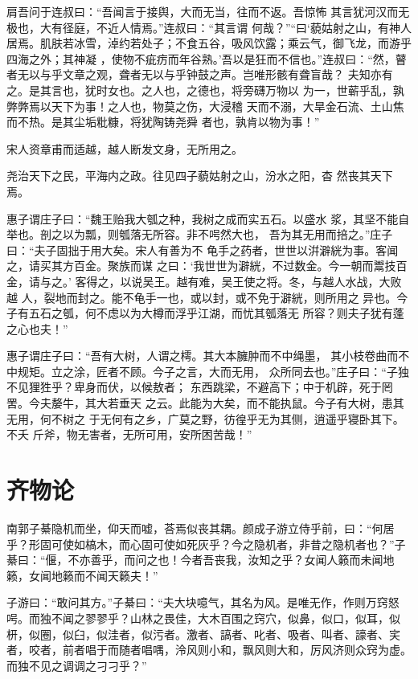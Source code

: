 \documentclass[a4paper,12pt,UTF8,twoside]{ctexbook}
\begin{document}
肩吾问于连叔曰：“吾闻言于接舆，大而无当，往而不返。吾惊怖 其言犹河汉而无极也，大有径庭，不近人情焉。”连叔曰：“其言谓 何哉？”“曰‘藐姑射之山，有神人居焉。肌肤若冰雪，淖约若处子；不食五谷，吸风饮露；乘云气，御飞龙，而游乎四海之外；其神凝 ，使物不疵疠而年谷熟。’吾以是狂而不信也。”连叔曰：“然，瞽 者无以与乎文章之观，聋者无以与乎钟鼓之声。岂唯形骸有聋盲哉？ 夫知亦有之。是其言也，犹时女也。之人也，之德也，将旁礴万物以 为一，世蕲乎乱，孰弊弊焉以天下为事！之人也，物莫之伤，大浸稽 天而不溺，大旱金石流、土山焦而不热。是其尘垢粃糠，将犹陶铸尧舜 者也，孰肯以物为事！”

宋人资章甫而适越，越人断发文身，无所用之。

尧治天下之民，平海内之政。往见四子藐姑射之山，汾水之阳，杳 然丧其天下焉。

惠子谓庄子曰：“魏王贻我大瓠之种，我树之成而实五石。以盛水 浆，其坚不能自举也。剖之以为瓢，则瓠落无所容。非不呺然大也， 吾为其无用而掊之。”庄子曰：“夫子固拙于用大矣。宋人有善为不 龟手之药者，世世以洴澼絖为事。客闻之，请买其方百金。聚族而谋 之曰：‘我世世为澼絖，不过数金。今一朝而鬻技百金，请与之。’ 客得之，以说吴王。越有难，吴王使之将。冬，与越人水战，大败越 人，裂地而封之。能不龟手一也，或以封，或不免于澼絖，则所用之 异也。今子有五石之瓠，何不虑以为大樽而浮乎江湖，而忧其瓠落无 所容？则夫子犹有蓬之心也夫！”

惠子谓庄子曰：“吾有大树，人谓之樗。其大本臃肿而不中绳墨， 其小枝卷曲而不中规矩。立之涂，匠者不顾。今子之言，大而无用， 众所同去也。”庄子曰：“子独不见狸狌乎？卑身而伏，以候敖者； 东西跳梁，不避高下；中于机辟，死于罔罟。今夫嫠牛，其大若垂天 之云。此能为大矣，而不能执鼠。今子有大树，患其无用，何不树之 于无何有之乡，广莫之野，彷徨乎无为其侧，逍遥乎寝卧其下。不夭 斤斧，物无害者，无所可用，安所困苦哉！”

\section{齐物论}

南郭子綦隐机而坐，仰天而嘘，荅焉似丧其耦。颜成子游立侍乎前，曰：“何居乎？形固可使如槁木，而心固可使如死灰乎？今之隐机者，非昔之隐机者也？”子綦曰：“偃，不亦善乎，而问之也！今者吾丧我，汝知之乎？女闻人籁而未闻地籁，女闻地籁而不闻天籁夫！”

子游曰：“敢问其方。”子綦曰：“夫大块噫气，其名为风。是唯无作，作则万窍怒呺。而独不闻之翏翏乎？山林之畏佳，大木百围之窍穴，似鼻，似口，似耳，似枅，似圈，似臼，似洼者，似污者。激者、謞者、叱者、吸者、叫者、譹者、宎者，咬者，前者唱于而随者唱喁，泠风则小和，飘风则大和，厉风济则众窍为虚。而独不见之调调之刁刁乎？”
\end{document}
